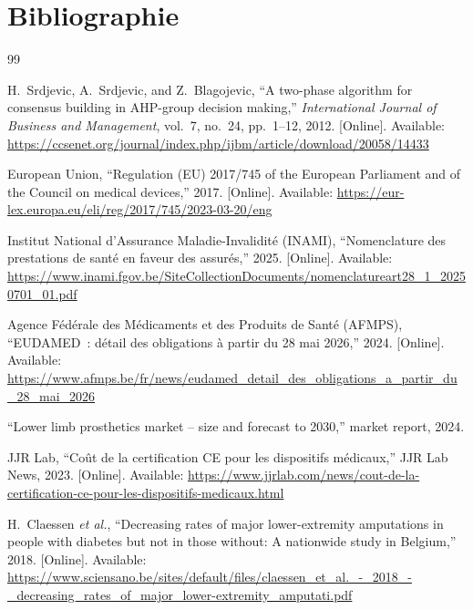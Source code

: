 \chapter{Bibliographie}
\label{chap:bibliographie}


\begin{thebibliography}{99}

H.~Srdjevic, A.~Srdjevic, and Z.~Blagojevic, ``A two-phase algorithm for consensus building in AHP-group decision making,'' \emph{International Journal of Business and Management}, vol.~7, no.~24, pp.~1--12, 2012. [Online]. Available: \url{https://ccsenet.org/journal/index.php/ijbm/article/download/20058/14433}

European Union, ``Regulation (EU) 2017/745 of the European Parliament and of the Council on medical devices,'' 2017. [Online]. Available: \url{https://eur-lex.europa.eu/eli/reg/2017/745/2023-03-20/eng}

Institut National d'Assurance Maladie-Invalidité (INAMI), ``Nomenclature des prestations de santé en faveur des assurés,'' 2025. [Online]. Available: \url{https://www.inami.fgov.be/SiteCollectionDocuments/nomenclatureart28_1_20250701_01.pdf}

Agence Fédérale des Médicaments et des Produits de Santé (AFMPS), ``EUDAMED~: détail des obligations à partir du 28 mai 2026,'' 2024. [Online]. Available: \url{https://www.afmps.be/fr/news/eudamed_detail_des_obligations_a_partir_du_28_mai_2026}

``Lower limb prosthetics market -- size and forecast to 2030,'' market report, 2024.

JJR Lab, ``Co\^{u}t de la certification CE pour les dispositifs m\'{e}dicaux,'' JJR Lab News, 2023. [Online]. Available: \url{https://www.jjrlab.com/news/cout-de-la-certification-ce-pour-les-dispositifs-medicaux.html}
    
H.~Claessen \emph{et al.}, ``Decreasing rates of major lower-extremity amputations in people with diabetes but not in those without: A nationwide study in Belgium,'' 2018. [Online]. Available: \url{https://www.sciensano.be/sites/default/files/claessen_et_al._-_2018_-_decreasing_rates_of_major_lower-extremity_amputati.pdf}


\end{thebibliography}
